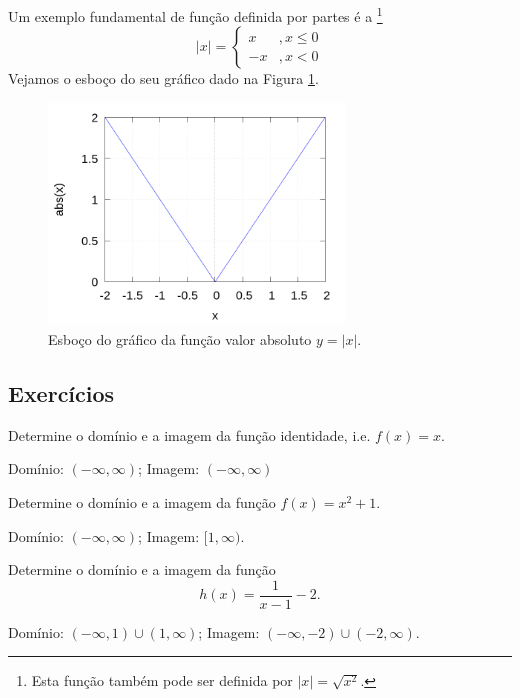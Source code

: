 Um exemplo fundamental de função definida por partes é a \footnote{Esta função também pode ser definida por $|x| = \sqrt{x^2}$.}
\begin{equation}
  |x| = \left\{
    \begin{array}{ll}
      x &, x\leq 0\\
      -x &, x<0
    \end{array}
\right.
\end{equation}
Vejamos o esboço do seu gráfico dado na Figura \ref{fig:funabs}.

\begin{figure}[H]
  \centering
  \includegraphics[width=0.7\textwidth]{./cap_funcao/dados/fig_funabs/fig_funabs}
  \caption{Esboço do gráfico da função valor absoluto $y=|x|$.}
  \label{fig:funabs}
\end{figure}


\subsection*{Exercícios}

\begin{ex}
  Determine o domínio e a imagem da função identidade, i.e. $f(x) = x$.
\end{ex}
\begin{resp}
  Domínio: $(-\infty, \infty)$; Imagem: $(-\infty, \infty)$
\end{resp}

\begin{ex}
  Determine o domínio e a imagem da função $f(x) = x^2 + 1$.
\end{ex}
\begin{resp}
  Domínio: $(-\infty, \infty)$; Imagem: $[1, \infty)$.
\end{resp}

\begin{ex}
  Determine o domínio e a imagem da função
  \begin{equation}
    h(x) = \frac{1}{x-1} - 2.
  \end{equation}
\end{ex}
\begin{resp}
  Domínio: $(-\infty, 1)\cup (1, \infty)$; Imagem: $(-\infty, -2)\cup (-2, \infty)$.
\end{resp}

